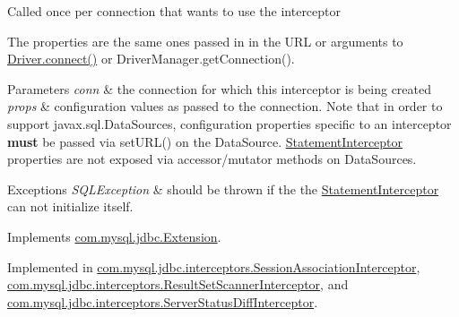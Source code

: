 Called once per connection that wants to use the interceptor

The properties are the same ones passed in in the U\+RL or arguments to \mbox{\hyperlink{classcom_1_1mysql_1_1jdbc_1_1_non_registering_driver_a834c012e752a01d1ee435b3461bb8218}{Driver.\+connect()}} or Driver\+Manager.\+get\+Connection().


\begin{DoxyParams}{Parameters}
{\em conn} & the connection for which this interceptor is being created \\
\hline
{\em props} & configuration values as passed to the connection. Note that in order to support javax.\+sql.\+Data\+Sources, configuration properties specific to an interceptor {\bfseries must} be passed via set\+U\+R\+L() on the Data\+Source. \mbox{\hyperlink{interfacecom_1_1mysql_1_1jdbc_1_1_statement_interceptor}{Statement\+Interceptor}} properties are not exposed via accessor/mutator methods on Data\+Sources.\\
\hline
\end{DoxyParams}

\begin{DoxyExceptions}{Exceptions}
{\em S\+Q\+L\+Exception} & should be thrown if the the \mbox{\hyperlink{interfacecom_1_1mysql_1_1jdbc_1_1_statement_interceptor}{Statement\+Interceptor}} can not initialize itself. \\
\hline
\end{DoxyExceptions}


Implements \mbox{\hyperlink{interfacecom_1_1mysql_1_1jdbc_1_1_extension_a79427811058193260bd4df0c38414e88}{com.\+mysql.\+jdbc.\+Extension}}.



Implemented in \mbox{\hyperlink{classcom_1_1mysql_1_1jdbc_1_1interceptors_1_1_session_association_interceptor_a525a3bac6a24ac0af33c1c1f1961f669}{com.\+mysql.\+jdbc.\+interceptors.\+Session\+Association\+Interceptor}}, \mbox{\hyperlink{classcom_1_1mysql_1_1jdbc_1_1interceptors_1_1_result_set_scanner_interceptor_a05bd31d17303e90f2933891426772f11}{com.\+mysql.\+jdbc.\+interceptors.\+Result\+Set\+Scanner\+Interceptor}}, and \mbox{\hyperlink{classcom_1_1mysql_1_1jdbc_1_1interceptors_1_1_server_status_diff_interceptor_a3d503667dd4d8f6dcaf6fbf4535bd5bf}{com.\+mysql.\+jdbc.\+interceptors.\+Server\+Status\+Diff\+Interceptor}}.

